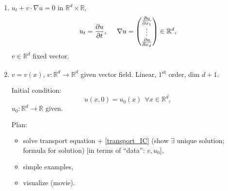 \documentclass[12pt]{article}
\theoremstyle{definition}
\begin{document}
\begin{enumerate}[label=\alph*)]
\item\label{transport} $u_t+v\cdot\nabla u=0$ in $\mathbb{R}^d\times\mathbb{R}$,
\[u_t=\frac{\partial u}{\partial t},\hspace{5mm}\nabla u=\left(\begin{matrix}\frac{\partial u}{\partial x_1}\\\vdots\\\frac{\partial u}{\partial x_d}\end{matrix}\right)\in\mathbb{R}^d,\]
$v\in\mathbb{R}^d$ fixed vector.

\item $v=v(x)$, $v:\mathbb{R}^d\rightarrow\mathbb{R}^d$ given vector field. Linear, $1$\textsuperscript{st} order, dim $d+1$.

Initial condition:
\begin{equation}\tag{IC}\label{transport_IC}
u(x,0)=u_0(x)\ \ \forall x\in\mathbb{R}^d,
\end{equation}
$u_0:\mathbb{R}^d\rightarrow\mathbb{R}$ given.

Plan:
\begin{itemize}
\item solve transport equation + \eqref{transport_IC} (show $\exists$ unique solution; formula for solution) [in terms of ``data'': $v,u_0$],
\item simple examples,
\item visualize (movie).
\end{itemize}
\end{enumerate}
\end{document}
